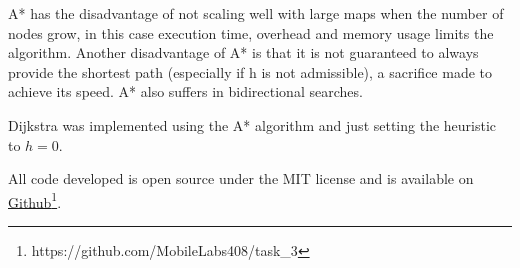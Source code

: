 
A* has the disadvantage of not scaling well with large maps when the number of nodes grow, in this case execution time, overhead and memory usage limits the algorithm\:\cite{patel_comparative_2021}\cite{foead_systematic_2021}. Another disadvantage of A* is that it is not guaranteed to always provide the shortest path (especially if h is not admissible)\:\cite{ogata_generic_2020}\cite{foead_systematic_2021}, a sacrifice made to achieve its speed\:\cite{bhateja_performance_2021}. A* also suffers in bidirectional searches\:\cite{foead_systematic_2021}.



Dijkstra was implemented using the A* algorithm and just setting the heuristic to $h = 0$\:\cite{siciliano_robotics_2009}\cite{ogata_generic_2020}.

All code developed is open source under the MIT license and is available on \href{https://github.com/MobileLabs408/task_3}{Github}\footnote{https://github.com/MobileLabs408/task\_3}.

